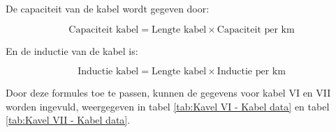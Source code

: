 De capaciteit van de kabel wordt gegeven door\cite{Kabel_ABB}:

\begin{equation} \label{eq:29}
\text{{Capaciteit kabel}} = \text{{Lengte kabel}} \times \text{{Capaciteit per km}}
\end{equation} 

En de inductie van de kabel is\cite{Kabel_ABB}:

\begin{equation} \label{eq:30}
\text{{Inductie kabel}} = \text{{Lengte kabel}} \times \text{{Inductie per km}}
\end{equation} 

Door deze formules toe te passen, kunnen de gegevens voor kabel VI en VII worden ingevuld, weergegeven in tabel \ref{tab:Kavel VI - Kabel data} en tabel \ref{tab:Kavel VII - Kabel data}.

